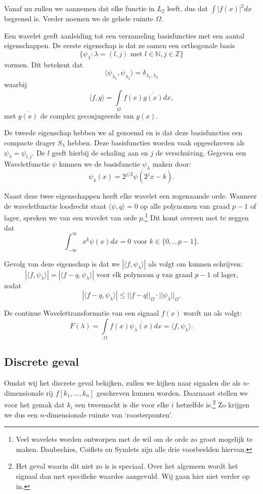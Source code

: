 \documentclass[11pt]{amsart}
\newcommand{\N}{\mathbb{N}}
\newcommand{\Z}{\mathbb{Z}}
\begin{document}
Vanaf nu zullen we aannemen dat elke functie in $L_2$ leeft, dus dat $\int |f(x)|^2 dx$ begrensd is. Verder noemen we de gehele ruimte $\Omega$.

Een wavelet geeft aanleiding tot een verzameling basisfuncties met een aantal eigenschappen. De eerste eigenschap is dat ze samen een orthogonale basis
\[
\{ \psi_\lambda: \lambda = (l,j)\text{ met } l \in \N,j \in \Z \}\]
 vormen. Dit betekent dat 
\[
\langle \psi_{\lambda_1}, \psi_{\lambda_2} \rangle = \delta_{\lambda_1, \lambda_2}
\]
 waarbij 
\[
\langle f, g\rangle = \underset{\Omega}{\int} f(x) \overline{g(x)} dx,
\]
met $\overline{g(x)}$ de complex geconjugeerde van $g(x)$.

De tweede eigenschap hebben we al genoemd en is dat deze basisfuncties een compacte drager $S_\lambda$ hebben. Deze basisfuncties worden vaak opgeschreven als $\psi_\lambda = \psi_{l,j}$. De $l$ geeft hierbij de schaling aan en $j$ de verschuiving. Gegeven een Waveletfunctie $\psi$ kunnen we de basisfunctie $\psi_\lambda$ maken door:
\[
	\psi_\lambda(x) = 2^{j/2} \psi(2^jx - k).
\]

Naast deze twee eigenschappen heeft elke wavelet een zogenaamde orde. Wanneer de waveletfunctie loodrecht staat $\langle \psi, q\rangle = 0$ op alle polynomen van graad $p-1$ of lager, spreken we van een wavelet van orde $p$.\footnote{Veel wavelets worden ontworpen met de wil om de orde zo groot mogelijk te maken. Daubechies, Coiflets en Symlets zijn alle drie voorbeelden hiervan.} Dit komt overeen met te zeggen dat
\[
	\int_{-\infty}^\infty x^k \psi(x) dx = 0 \text{ voor } k \in \{ 0, \ldots p-1 \}.
\]

Gevolg van deze eigenschap is dat we $|\langle f, \psi_\lambda\rangle |$ als volgt om kunnen schrijven:
\[
	|\langle f, \psi_\lambda \rangle | = |\langle f-q, \psi_\lambda \rangle | \text{ voor elk polynoom $q$ van graad $p-1$ of lager,} 
\]
zodat
\[
	|\langle f-q, \psi_\lambda \rangle | \leq ||f-q||_\Omega \cdot ||\psi_\lambda||_\Omega.
\]


De continue Wavelettransformatie van een signaal $f(x)$ wordt nu als volgt:
\[
	F(\lambda) = \underset{\Omega}{\int} f(x) \overline{\psi_\lambda(x)} dx = \langle f, \psi_\lambda \rangle.
\]

\subsection{Discrete geval}
Omdat wij het discrete geval bekijken, zullen we kijken naar signalen die als $n$-dimensionale rij $f[k_1,\ldots,k_n]$ geschreven kunnen worden. Daarnaast stellen we voor het gemak dat $k_i$ een tweemacht is die voor elke $i$ hetzelfde is.\footnote{Het geval waarin dit niet zo is is speciaal. Over het algemeen wordt het signaal dan met specifieke waardes aangevuld. Wij gaan hier niet verder op in.} Zo krijgen we dus een $n$-dimensionale ruimte van `roosterpunten'.
\end{document}
